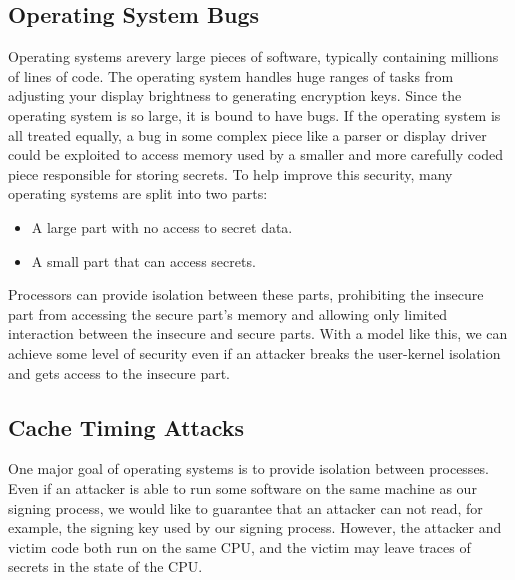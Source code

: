 \subsection{Operating System Bugs}
Operating systems arevery large pieces of software, typically containing millions of lines of code. The operating system handles huge ranges of tasks from adjusting your display brightness to generating encryption keys. Since the operating system is so large, it is bound to have bugs. If the operating system is all treated equally, a bug in some complex piece like a parser or display driver could be exploited to access memory used by a smaller and more carefully coded piece responsible for storing secrets. To help improve this security, many operating systems are split into two parts:
\begin{itemize}
	\item A large  part with no access to secret data.
	\item A small  part that can access secrets.
\end{itemize}

Processors can provide isolation between these parts, prohibiting the insecure part from accessing the secure part's memory and allowing only limited interaction between the insecure and secure parts. With a model like this, we can achieve some level of security even if an attacker breaks the user-kernel isolation and gets access to the insecure part.

\subsection{Cache Timing Attacks}
One major goal of operating systems is to provide isolation between processes. Even if an attacker is able to run some software on the same machine as our signing process, we would like to guarantee that an attacker can not read, for example, the signing key used by our signing process. However, the attacker and victim code both run on the same CPU, and the victim may leave traces of secrets in the state of the CPU.

